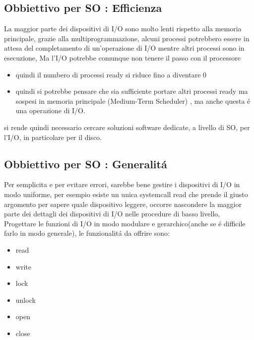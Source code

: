 \subsection{Obbiettivo per SO : Efficienza}
La maggior parte dei dispositivi di I/O sono molto lenti rispetto alla memoria principale, grazie alla multiprogrammazione, alcuni
processi potrebbero essere in attesa del completamento di un'operazione di I/O mentre altri processi sono in esecuzione, Ma l'I/O potrebbe comunque
non tenere il passo con il processore
\begin{itemize}
    \item quindi il numbero di processi ready si riduce fino a diventare 0
    \item  quindi si potrebbe pensare che sia sufficiente portare altri processi ready ma sospesi in memoria principale (Medium-Term Scheduler) , ma anche questa é una operazione di I/O.
\end{itemize}
 si rende quindi necessario
cercare soluzioni software dedicate, a livello di SO, per l'I/O, in particolare per il disco.
\subsection{Obbiettivo per SO : Generalitá}
Per semplicita e per evitare errori, sarebbe bene gestire i dispositivi di I/O in modo uniforme, per esempio esiste un
unica systemcall read che prende il giusto argomento per sapere quale dispositivo leggere, occorre nascondere la maggior
parte dei dettagli dei dispositivi di I/O nelle procedure di basso livello, Progettare le funzioni di I/O in modo modulare
e gerarchico(anche se é difficile farlo in modo generale), le funzionalitá da offrire sono:
\begin{itemize}
    \item read
    \item write
    \item lock
    \item unlock
    \item open
    \item close
\end{itemize}
